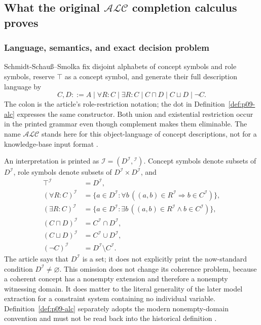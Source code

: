 
\subsection{What the original \(\mathcal{ALC}\) completion calculus proves}
\label{sec:p09-presentation-n-c-009}

\subsubsection{Language, semantics, and exact decision problem}

Schmidt-Schau\ss--Smolka fix disjoint alphabets of concept symbols and role
symbols, reserve \(\top\) as a concept symbol, and generate their full
description language by
\[
 C,D ::= A
 \mid \forall R:C
 \mid \exists R:C
 \mid C\sqcap D
 \mid C\sqcup D
 \mid \neg C.
\]
The colon is the article's role-restriction notation; the dot in
Definition~\ref{def:p09-alc} expresses the same constructor.  Both union and
existential restriction occur in the printed grammar even though complement
makes them eliminable.  The name \(\mathcal{ALC}\) stands here for this
object-language of concept descriptions, not for a knowledge-base input format
\cite[\S2, pp.~5--6]{SchmidtSchaussSmolka1991}.

An interpretation is printed as
\(\mathcal I=(D^{\mathcal I},{}^{\mathcal I})\).  Concept symbols denote
subsets of \(D^{\mathcal I}\), role symbols denote subsets of
\(D^{\mathcal I}\times D^{\mathcal I}\), and
\[
\begin{aligned}
 \top^{\mathcal I}&=D^{\mathcal I},\\
 (\forall R:C)^{\mathcal I}
   &=\{a\in D^{\mathcal I}:
       \forall b\,((a,b)\in R^{\mathcal I}\Rightarrow
                         b\in C^{\mathcal I})\},\\
 (\exists R:C)^{\mathcal I}
   &=\{a\in D^{\mathcal I}:
       \exists b\,((a,b)\in R^{\mathcal I}\land
                         b\in C^{\mathcal I})\},\\
 (C\sqcap D)^{\mathcal I}&=C^{\mathcal I}\cap D^{\mathcal I},\\
 (C\sqcup D)^{\mathcal I}&=C^{\mathcal I}\cup D^{\mathcal I},\\
 (\neg C)^{\mathcal I}&=D^{\mathcal I}\setminus C^{\mathcal I}.
\end{aligned}
\]
The article says that \(D^{\mathcal I}\) is a set; it does not explicitly
print the now-standard condition \(D^{\mathcal I}\ne\varnothing\).  This
omission does not change its coherence problem, because a coherent concept has
a nonempty extension and therefore a nonempty witnessing domain.  It does
matter to the literal generality of the later model extraction for a constraint
system containing no individual variable.  Definition~\ref{def:p09-alc}
separately adopts the modern nonempty-domain convention and must not be read
back into the historical definition
\cite[\S2, p.~5]{SchmidtSchaussSmolka1991}.

